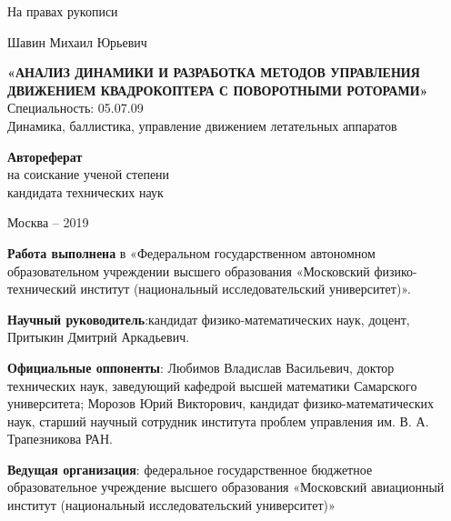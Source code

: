 \thispagestyle{empty}

{
	\vskip 5mm
}

\begin{flushright}
	На правах рукописи
\end{flushright}


{
	\vskip 45mm
}

\begin{center}
	Шавин Михаил Юрьевич
\end{center}
\begin{center} 
	\textbf{«АНАЛИЗ ДИНАМИКИ И РАЗРАБОТКА МЕТОДОВ УПРАВЛЕНИЯ ДВИЖЕНИЕМ КВАДРОКОПТЕРА С ПОВОРОТНЫМИ РОТОРАМИ»} \\
	Специальность: 05.07.09 \\
	Динамика, баллистика, управление движением летательных аппаратов
\end{center}

{
	\vskip 20mm
}

\begin{center} 
	\textbf{Автореферат} \\
	на соискание ученой степени \\
	кандидата технических наук
\end{center}


{
	\vskip 55mm
}

\begin{center} 
	Москва -- 2019
\end{center}

\newpage %

\textbf{Работа выполнена} в «Федеральном государственном автономном образовательном учреждении высшего образования «Московский физико-технический институт (национальный исследовательский университет)».

\textbf{Научный руководитель}:кандидат физико-математических наук, доцент, Притыкин Дмитрий Аркадьевич.

\textbf{Официальные оппоненты}: Любимов Владислав Васильевич, доктор технических наук, заведующий кафедрой высшей математики Самарского университета;
Морозов Юрий Викторович, кандидат физико-математических наук, старший научный сотрудник института проблем управления им. В. А. Трапезникова РАН.

\textbf{Ведущая организация}:
федеральное государственное бюджетное образовательное учреждение высшего образования «Московский авиационный институт (национальный исследовательский университет)»\\


